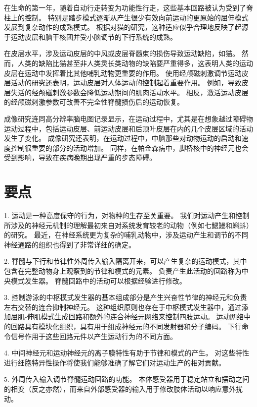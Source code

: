 在生命的第一年，随着自动行走转变为功能性行走，这些基本回路被认为受到了脊柱上的控制。
特别是踏步模式逐渐从产生很少有效向前运动的更原始的屈伸模式发展到复杂动作的成熟模式。
根据对猫的研究，这种适应似乎合理地反映了起源于运动皮层和脑干核团并受小脑调节的下行系统的成熟。


在皮层水平，涉及运动皮层的中风或皮层脊髓束的损伤导致运动缺陷，如猫。
然而，人类的缺陷比猫甚至非人类灵长类动物的缺陷要严重得多，这表明人类的运动皮层在运动中发挥着比其他哺乳动物更重要的作用。
使用经颅磁刺激调节运动皮层活动的研究还表明，运动皮层对人体运动的控制起着重要作用。
例如，导致皮层失活的经颅磁刺激参数会降低运动期间的肌肉活动水平。
相反，激活运动皮层的经颅磁刺激参数可改善不完全性脊髓损伤后的运动恢复。


成像研究连同高分辨率脑电图记录显示，在运动过程中，尤其是在想象越过障碍物运动过程中，包括运动皮层、前运动皮层和后顶叶皮层在内的几个皮层区域的活动发生了变化。
成像研究还表明，在运动过程中，中脑那些对动物运动的启动和速度控制很重要的部分的活动增加。
同样，在帕金森病中，脚桥核中的神经元也会受到影响，导致在疾病晚期出现严重的步态障碍。



\section{要点}

1. 运动是一种高度保守的行为，对物种的生存至关重要。
我们对运动产生和控制所涉及的神经元机制的理解最初来自对系统发育较老的动物（例如七鳃鳗和蝌蚪）的研究。
最近，在神经系统更为复杂的哺乳动物中，涉及运动产生和调节的不同神经通路的组织也得到了非常详细的确定。 


2. 脊髓与下行和节律性外周传入输入隔离开来，可以产生复杂的运动模式，其中包含在完整动物身上观察到的节律和模式的元素。
负责产生此活动的回路称为中央模式发生器。 
脊髓回路中的活动可以根据经验进行修改。


3. 控制游泳的中枢模式发生器的基本组成部分是产生兴奋性节律的神经元和负责左右交替的连合抑制神经元。
这种组织原则也存在于中枢模式发生器中，通过添加屈肌-伸肌模式生成回路和额外的连合神经元网络来控制四肢运动。
运动网络中的回路具有模块化组织，具有用于组成神经元的不同发射器和分子编码。
下行命令信号作用于这些回路元件以产生运动行为的不同方面。


4. 中间神经元和运动神经元的离子膜特性有助于节律和模式的产生。
对这些特性进行细胞特异性操作将使我们能够准确了解它们对运动生产的相对贡献。


5. 外周传入输入调节脊髓运动回路的功能。
本体感受器用于稳定站立和摆动之间的相变（反之亦然），而来自外部感受器的输入用于修改肢体活动以响应意外扰动。 


